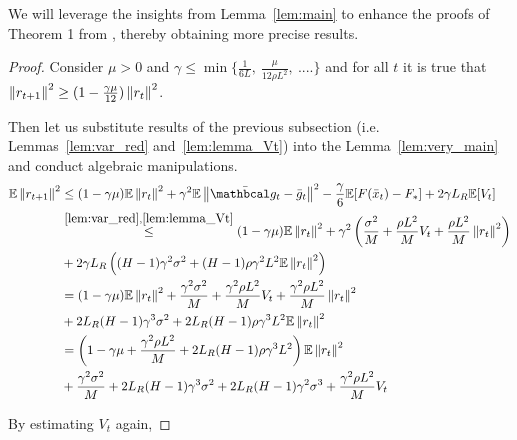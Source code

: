 We will leverage the insights from Lemma~\ref{lem:main} to enhance the proofs of Theorem 1 from \cite{Khaled}, thereby obtaining more precise results.

\begin{proof}
    Consider $\mu > 0$ 
    and $\gamma \leq \min \{ \frac{1}{6L},\ \frac{\mu}{12\rho L^2},\ .... \}$
    and for all $t$ it is true that $\left\|r_{t+1}\right\|^2 \geq (1 - \frac{\gamma \mu}{12})\left\|r_t\right\|^2$.

    Then let us substitute results of the previous subsection (i.e. Lemmas~\ref{lem:var_red}
and~\ref{lem:lemma_Vt}) into the Lemma~\ref{lem:very_main} and conduct algebraic manipulations.
\begin{align}
    \E \norm{r_{t+1}}^2
    &\leq (1 - \gamma \mu) \E \norm{r_t}^2 
    + \gamma^2 \E \norm{ \bar{\mc{g_t}} - \bar{g}_t}^2
    - \frac{\gamma}{6} \E [F(\bar{x}_t) - F_*] 
    + 2 \gamma L_R \E [V_t] \\
    &\overset{\ref{lem:var_red}, \ref{lem:lemma_Vt}}{\leq}
    (1 - \gamma \mu) \E \norm{r_t}^2 
    + \gamma^2 
    \left(\frac{\sigma^2}{M} + \frac{\rho L^2 }{M} V_t  + \frac{\rho L^2 }{M} \norm{r_t}^2 \right) \\
    &+ 2 \gamma L_R 
    \left((H-1) \gamma^2 \sigma^2 + (H-1) \rho \gamma^2 L^2 \E \norm{r_t}^2 \right) \\
    &= (1 - \gamma \mu) \E \norm{r_t}^2 
    + \frac{\gamma^2 \sigma^2}{M} + \frac{\gamma^2 \rho L^2 }{M} V_t  + \frac{\gamma^2 \rho L^2 }{M} \norm{r_t}^2 \\
    &+ 
    2 L_R (H-1) \gamma^3 \sigma^2 + 2 L_R (H-1) \rho \gamma^3 L^2 \E \norm{r_t}^2 \\
    &=
    \left( 1 - \gamma \mu + \frac{\gamma^2 \rho L^2 }{M} + 2 L_R (H-1) \rho \gamma^3 L^2 \right)
    \E \norm{r_t}^2 \\
    &+ \frac{\gamma^2 \sigma^2}{M} + 2 L_R (H-1) \gamma^3 \sigma^2 + 2 L_R (H-1) \gamma^2 \sigma^3
    + \frac{\gamma^2 \rho L^2 }{M} V_t \\
\end{align}

By estimating $V_t$ again,


\end{proof}
